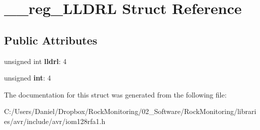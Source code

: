 \hypertarget{struct____reg___l_l_d_r_l}{}\section{\+\_\+\+\_\+reg\+\_\+\+L\+L\+D\+RL Struct Reference}
\label{struct____reg___l_l_d_r_l}
\subsection*{Public Attributes}
\begin{DoxyCompactItemize}
\item 
unsigned int {\bfseries lldrl}\+: 4\hypertarget{struct____reg___l_l_d_r_l_a8d9fc96ee823692f4d8f900f5c5fda2b}{}\label{struct____reg___l_l_d_r_l_a8d9fc96ee823692f4d8f900f5c5fda2b}

\item 
unsigned {\bfseries int}\+: 4\hypertarget{struct____reg___l_l_d_r_l_a71517a32beaacaaa2de7e5c66fd63231}{}\label{struct____reg___l_l_d_r_l_a71517a32beaacaaa2de7e5c66fd63231}

\end{DoxyCompactItemize}


The documentation for this struct was generated from the following file\+:\begin{DoxyCompactItemize}
\item 
C\+:/\+Users/\+Daniel/\+Dropbox/\+Rock\+Monitoring/02\+\_\+\+Software/\+Rock\+Monitoring/libraries/avr/include/avr/iom128rfa1.\+h\end{DoxyCompactItemize}
